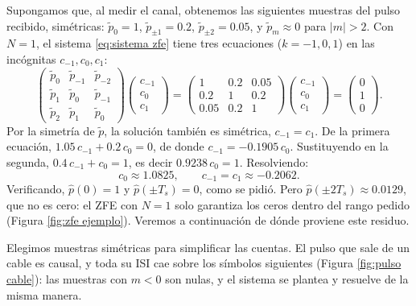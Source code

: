 \begin{ejemplo}[ZFE de tres ganancias, $N=1$]\label{ejemplo:zfe n1}
Supongamos que, al medir el canal, obtenemos las siguientes muestras del pulso recibido, simétricas: $\tilde p_0=1$, $\tilde p_{\pm 1}=0.2$, $\tilde p_{\pm 2}=0.05$, y $\tilde p_m\approx 0$ para $|m|>2$. Con $N=1$, el sistema \eqref{eq:sistema zfe} tiene tres ecuaciones ($k=-1,0,1$) en las incógnitas $c_{-1},c_0,c_1$:
\begin{equation*}
    \begin{pmatrix} \tilde p_0 & \tilde p_{-1} & \tilde p_{-2} \\ \tilde p_1 & \tilde p_0 & \tilde p_{-1} \\ \tilde p_2 & \tilde p_1 & \tilde p_0 \end{pmatrix}
    \begin{pmatrix} c_{-1} \\ c_0 \\ c_1 \end{pmatrix}
    =
    \begin{pmatrix} 1 & 0.2 & 0.05 \\ 0.2 & 1 & 0.2 \\ 0.05 & 0.2 & 1 \end{pmatrix}
    \begin{pmatrix} c_{-1} \\ c_0 \\ c_1 \end{pmatrix}
    =
    \begin{pmatrix} 0 \\ 1 \\ 0 \end{pmatrix}.
\end{equation*}
Por la simetría de $\tilde p$, la solución también es simétrica, $c_{-1}=c_1$. De la primera ecuación, $1.05\,c_{-1} + 0.2\, c_0 = 0$, de donde $c_{-1}=-0.1905\, c_0$. Sustituyendo en la segunda, $0.4\,c_{-1}+c_0=1$, es decir $0.9238\, c_0 = 1$. Resolviendo:
\begin{equation*}
    c_0 \approx 1.0825, \qquad c_{-1}=c_1\approx -0.2062.
\end{equation*}
Verificando, $\hat p(0)=1$ y $\hat p(\pm T_s)=0$, como se pidió. Pero $\hat p(\pm 2T_s)\approx 0.0129$, que no es cero: el ZFE con $N=1$ solo garantiza los ceros dentro del rango pedido (Figura \ref{fig:zfe ejemplo}). Veremos a continuación de dónde proviene este residuo.

Elegimos muestras simétricas para simplificar las cuentas. El pulso que sale de un cable es causal, y toda su ISI cae sobre los símbolos siguientes (Figura \ref{fig:pulso cable}): las muestras con $m<0$ son nulas, y el sistema se plantea y resuelve de la misma manera.
\end{ejemplo}

